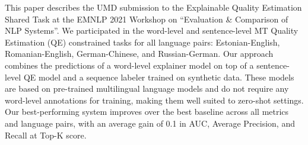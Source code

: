 This paper describes the UMD submission to the Explainable Quality Estimation Shared Task at the EMNLP 2021 Workshop on ``Evaluation \& Comparison of NLP Systems''. We participated in the word-level and sentence-level MT Quality Estimation (QE) constrained tasks for all language pairs: Estonian-English, Romanian-English, German-Chinese, and Russian-German. Our approach combines the predictions of a word-level explainer model on top of a sentence-level QE model and a sequence labeler trained on synthetic data.  These models are based on pre-trained multilingual language models and do not require any word-level annotations for training, making them well suited to zero-shot settings.  Our best-performing system improves over the best baseline across all metrics and language pairs, with an average gain of 0.1 in AUC, Average Precision, and Recall at Top-K score.
